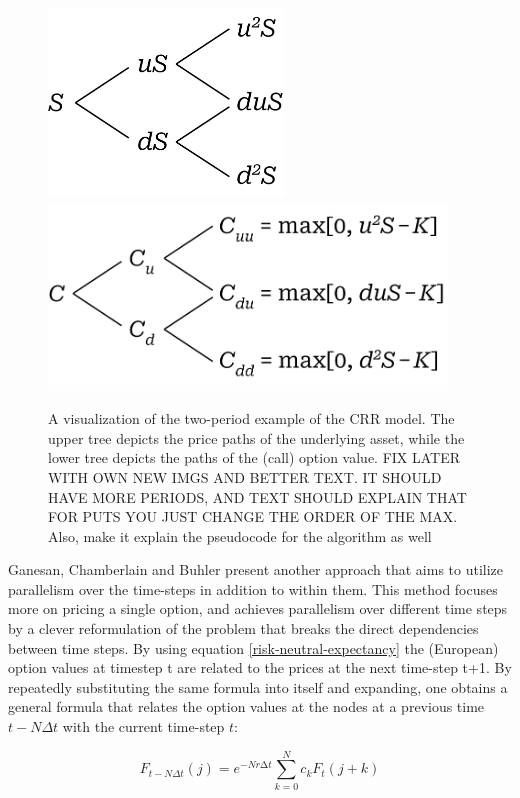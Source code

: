 \documentclass[english,12pt,a4paper,pdftex,sci,utf8]{aaltothesis}
\begin{document}
\begin{figure}[h]
    \centering
    \includegraphics[height=5cm]{two-period-stock.png}
    \includegraphics[height=5cm]{two-period-option.png}
    \caption{A visualization of the two-period example of the CRR model. The upper tree depicts the price paths of the underlying asset, while the lower tree depicts the paths of the (call) option value. FIX LATER WITH OWN NEW IMGS AND BETTER TEXT. IT SHOULD HAVE MORE PERIODS, AND TEXT SHOULD EXPLAIN THAT FOR PUTS YOU JUST CHANGE THE ORDER OF THE MAX. Also, make it explain the pseudocode for the algorithm as well}
    \label{fig:combined}
\end{figure}

Ganesan, Chamberlain and Buhler \cite{ganesan2009acceleration} present another approach that aims to utilize parallelism over the time-steps in addition to within them. This method focuses more on pricing a single option, and achieves parallelism over different time steps by a clever reformulation of the problem that breaks the direct dependencies between time steps. By using equation \eqref{risk-neutral-expectancy} the (European) option values at timestep t are related to the prices at the next time-step t+1. By repeatedly substituting the same formula into itself and expanding, one obtains a general formula that relates the option values at the nodes at a previous time $t-N\Delta t$ with the current time-step $t$:

\begin{equation}
    F_{t-N\Delta t}(j) = e^{-Nr∆t} \sum_{k=0}^N c_kF_t(j+k)
\label{relative-prices}
\end{equation}
\end{document}
